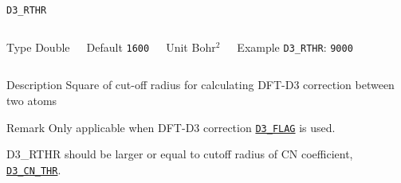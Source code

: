\begin{frame}[allowframebreaks]{\texttt{D3\_RTHR}} \label{D3_RTHR}
\vspace*{-12pt}
\begin{columns}
\begin{block}{Type}
Double
\end{block}

\begin{block}{Default}
\texttt{1600}
\end{block}

\begin{block}{Unit}
Bohr$^2$
\end{block}

\begin{block}{Example}
\texttt{D3\_RTHR}: \texttt{9000}
\end{block}
\end{columns}

\begin{block}{Description}
Square of cut-off radius for calculating DFT-D3 correction between two atoms
\end{block}

\begin{block}{Remark}
Only applicable when DFT-D3 correction \hyperlink{D3_FLAG}{\texttt{D3\_FLAG}} is used.

D3\_RTHR should be larger or equal to cutoff radius of CN coefficient, \hyperlink{D3_CN_THR}{\texttt{D3\_CN\_THR}}.
\end{block}

\end{frame}


